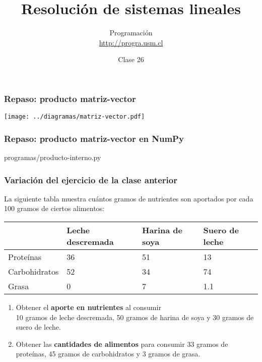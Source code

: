 \documentclass[12pt]{beamer}
\title{Resolución de sistemas lineales}
\author{
  Programación \\ \url{http://progra.usm.cl}
}
\date{Clase 26}
\begin{document}
  \begin{frame}
    \maketitle
  \end{frame}

  \begin{frame}
    \label{producto-matriz-vector}
    \frametitle{Repaso: producto matriz-vector}
    \texttt{[image: ../diagramas/matriz-vector.pdf]}
  \end{frame}

  \begin{frame}
    \label{producto-matriz-vector-numpy}
    \frametitle{Repaso: producto matriz-vector en NumPy}
    
        {programas/producto-interno.py}
  \end{frame}

  \begin{frame}
    \label{ejercicio-nutrientes}
    \frametitle{Variación del ejercicio de la clase anterior}
    La siguiente tabla muestra cuántos gramos de nutrientes
    son aportados por cada 100 gramos de ciertos alimentos:
    \vspace{2ex}

    {\footnotesize
    \begin{tabular}{lp{6em}p{6em}p{4.5em}}
      & \raggedright Leche descremada & \raggedright Harina de soya & {\raggedright Suero de leche} \\\hline
      Proteínas     &  36 &   51 &   13  \\\hline
      Carbohidratos &  52 &   34 &   74  \\\hline
      Grasa         &   0 &    7 &  1.1  \\\hline
    \end{tabular}}

    \begin{enumerate}
      \vspace{2ex}
      \item
        Obtener el \textbf{aporte en nutrientes} al consumir \\
        10 gramos de leche descremada,
        50 gramos de harina de soya y
        30 gramos de suero de leche.
      \vspace{2ex}
      \item
        Obtener las \textbf{cantidades de alimentos} para consumir
        33 gramos de proteínas,
        45 gramos de carbohidratos y
        3 gramos de grasa.
    \end{enumerate}
  \end{frame}
\end{document}
